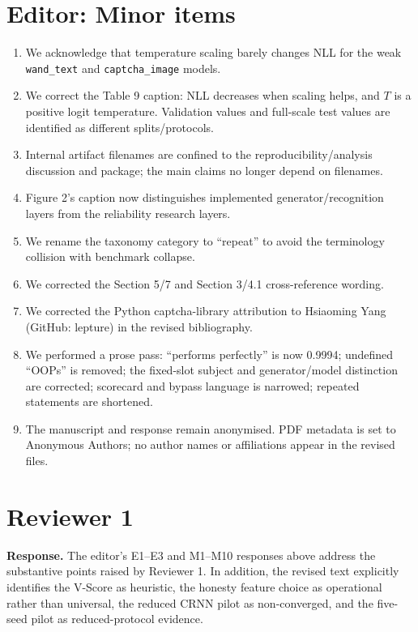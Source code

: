 \documentclass[11pt]{article}
\newcommand{\response}[1]{\par\noindent\textbf{Response.} #1\par}
\begin{document}
\section*{Editor: Minor items}
\begin{enumerate}
\item We acknowledge that temperature scaling barely changes NLL for the weak \texttt{wand\_text} and \texttt{captcha\_image} models.
\item We correct the Table 9 caption: NLL decreases when scaling helps, and $T$ is a positive logit temperature. Validation values and full-scale test values are identified as different splits/protocols.
\item Internal artifact filenames are confined to the reproducibility/analysis discussion and package; the main claims no longer depend on filenames.
\item Figure 2's caption now distinguishes implemented generator/recognition layers from the reliability research layers.
\item We rename the taxonomy category to ``repeat'' to avoid the terminology collision with benchmark collapse.
\item We corrected the Section 5/7 and Section 3/4.1 cross-reference wording.
\item We corrected the Python captcha-library attribution to Hsiaoming Yang (GitHub: lepture) in the revised bibliography.
\item We performed a prose pass: ``performs perfectly'' is now 0.9994; undefined ``OOPs'' is removed; the fixed-slot subject and generator/model distinction are corrected; scorecard and bypass language is narrowed; repeated statements are shortened.
\item The manuscript and response remain anonymised. PDF metadata is set to Anonymous Authors; no author names or affiliations appear in the revised files.
\end{enumerate}

\section*{Reviewer 1}
\response{The editor's E1--E3 and M1--M10 responses above address the substantive points raised by Reviewer 1. In addition, the revised text explicitly identifies the V-Score as heuristic, the honesty feature choice as operational rather than universal, the reduced CRNN pilot as non-converged, and the five-seed pilot as reduced-protocol evidence.}
\end{document}
